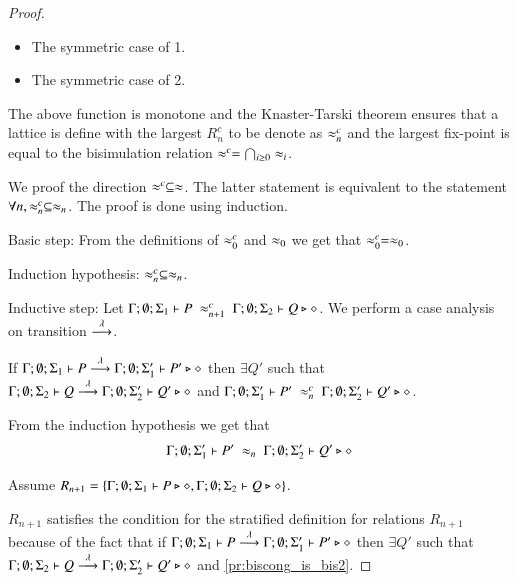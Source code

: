 \begin{proof}
\begin{itemize}
\begin{itemize}
				\item	The symmetric case of 1.
				\item	The symmetric case of 2.
			\end{itemize}
	\end{itemize}
	The above function is monotone and the Knaster-Tarski theorem ensures that a lattice is define
	with the largest $R^c_n$ to be denote as $\approx^{c}_n$ and the largest fix-point is equal to the bisimulation relation $\approx^{c} = \bigcap_{i \geq 0} \approx_i$.
	\vspace{3mm}


	We proof the direction $\approx^{c} \subseteq \approx$.
	The latter statement is equivalent to the statement $\forall n, \approx^{c}_n \subseteq \approx_n$.
	The proof is done using induction.

	Basic step: From the definitions of $\approx^{c}_0$ and $\approx_0$ we get that $\approx^{c}_0 = \approx_0$.

	Induction hypothesis: $\approx^{c}_n \subseteq \approx_n$.

	Inductive step: Let $\Gamma; \emptyset; \Sigma_1 \vdash P\ \approx^{c}_{n+1}\ \Gamma; \emptyset; \Sigma_2 \vdash Q \triangleright \diamond$.
	We perform a case analysis on transition $\stackrel{\lambda}{\longrightarrow}$.


	If $\Gamma; \emptyset; \Sigma_1 \vdash P \stackrel{\lambda}{\longrightarrow} \Gamma; \emptyset; \Sigma_1' \vdash P' \triangleright \diamond$ then
	$\exists Q'$ such that
	$\Gamma; \emptyset; \Sigma_2 \vdash Q \stackrel{\lambda}{\longrightarrow} \Gamma; \emptyset; \Sigma_2' \vdash Q' \triangleright \diamond$
	and
	$\Gamma; \emptyset; \Sigma_1' \vdash P'\ \approx^{c}_n\ \Gamma; \emptyset; \Sigma_2' \vdash Q' \triangleright \diamond$.

	From the induction hypothesis we get that
	\begin{eqnarray}
		\Gamma; \emptyset; \Sigma_1' \vdash P'\ \approx_n\ \Gamma; \emptyset; \Sigma_2' \vdash Q' \triangleright \diamond \label{pr:biscong_is_bis2}
	\end{eqnarray}

	Assume $R_{n+1} = \{\Gamma; \emptyset; \Sigma_1 \vdash P \triangleright \diamond, \Gamma; \emptyset; \Sigma_2 \vdash Q \triangleright \diamond\}$.

	$R_{n+1}$ satisfies the condition for the stratified definition for relations $R_{n+1}$ because of the fact that
	if $\Gamma; \emptyset; \Sigma_1 \vdash P \stackrel{\lambda}{\longrightarrow} \Gamma; \emptyset; \Sigma_1' \vdash P' \triangleright \diamond$ then
	$\exists Q'$ such that
	$\Gamma; \emptyset; \Sigma_2 \vdash Q \stackrel{\lambda}{\longrightarrow} \Gamma; \emptyset; \Sigma_2' \vdash Q' \triangleright \diamond$
	and \ref{pr:biscong_is_bis2}.


\end{proof}

